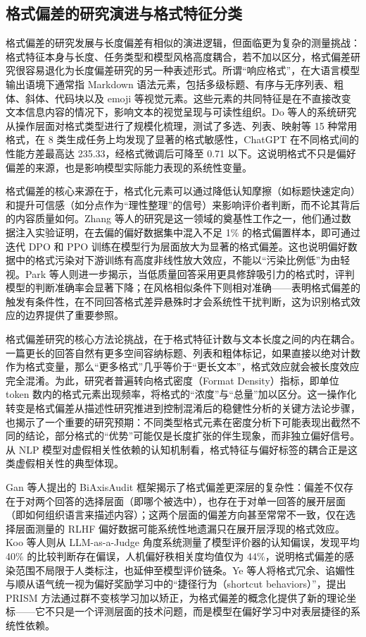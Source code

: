 \documentclass[9pt,a4paper,fontset=windows]{ctexart}
\theoremstyle{definition}
\numberwithin{equation}{section}
\begin{document}
\subsection{格式偏差的研究演进与格式特征分类}
格式偏差的研究发展与长度偏差有相似的演进逻辑，但面临更为复杂的测量挑战：格式特征本身与长度、任务类型和模型风格高度耦合，若不加以区分，格式偏差研究很容易退化为长度偏差研究的另一种表述形式。所谓“响应格式”，在大语言模型输出语境下通常指 Markdown 语法元素，包括多级标题、有序与无序列表、粗体、斜体、代码块以及 emoji 等视觉元素。这些元素的共同特征是在不直接改变文本信息内容的情况下，影响文本的视觉呈现与可读性组织。Do 等人的系统研究从操作层面对格式类型进行了规模化梳理，测试了多选、列表、映射等 15 种常用格式，在 8 类生成任务上均发现了显著的格式敏感性，ChatGPT 在不同格式间的性能方差最高达 235.33，经格式微调后可降至 0.71 以下。这说明格式不只是偏好偏差的来源，也是影响模型实际能力表现的系统性变量。

格式偏差的核心来源在于，格式化元素可以通过降低认知摩擦（如标题快速定向）和提升可信感（如分点作为“理性整理”的信号）来影响评价者判断，而不论其背后的内容质量如何。Zhang 等人的研究是这一领域的奠基性工作之一，他们通过数据注入实验证明，在去偏的偏好数据集中混入不足 1\% 的格式偏置样本，即可通过迭代 DPO 和 PPO 训练在模型行为层面放大为显著的格式偏差。这也说明偏好数据中的格式污染对下游训练有高度非线性放大效应，不能以“污染比例低”为由轻视。Park 等人则进一步揭示，当低质量回答采用更具修辞吸引力的格式时，评判模型的判断准确率会显著下降；在风格相似条件下则相对准确——表明格式偏差的触发有条件性，在不同回答格式差异悬殊时才会系统性干扰判断，这为识别格式效应的边界提供了重要参照。

格式偏差研究的核心方法论挑战，在于格式特征计数与文本长度之间的内在耦合。一篇更长的回答自然有更多空间容纳标题、列表和粗体标记，如果直接以绝对计数作为格式变量，那么“更多格式”几乎等价于“更长文本”，格式效应就会被长度效应完全混淆。为此，研究者普遍转向格式密度（Format Density）指标，即单位 token 数内的格式元素出现频率，将格式的“浓度”与“总量”加以区分。这一操作化转变是格式偏差从描述性研究推进到控制混淆后的稳健性分析的关键方法论步骤，也揭示了一个重要的研究预期：不同类型格式元素在密度分析下可能表现出截然不同的结论，部分格式的“优势”可能仅是长度扩张的伴生现象，而非独立偏好信号。从 NLP 模型对虚假相关性依赖的认知机制看，格式特征与偏好标签的耦合正是这类虚假相关性的典型体现。

Gan 等人提出的 BiAxisAudit 框架揭示了格式偏差更深层的复杂性：偏差不仅存在于对两个回答的选择层面（即哪个被选中），也存在于对单一回答的展开层面（即如何组织语言来描述内容）；这两个层面的偏差方向甚至常常不一致，仅在选择层面测量的 RLHF 偏好数据可能系统性地遗漏只在展开层浮现的格式效应。Koo 等人则从 LLM-as-a-Judge 角度系统测量了模型评价器的认知偏误，发现平均 40\% 的比较判断存在偏误，人机偏好秩相关度均值仅为 44\%，说明格式偏差的感染范围不局限于人类标注，也延伸至模型评价链条。Ye 等人将格式冗余、谄媚性与顺从语气统一视为偏好奖励学习中的“捷径行为（shortcut behaviors）”，提出 PRISM 方法通过群不变核学习加以矫正，为格式偏差的概念化提供了新的理论坐标——它不只是一个评测层面的技术问题，而是模型在偏好学习中对表层捷径的系统性依赖。
\end{document}
